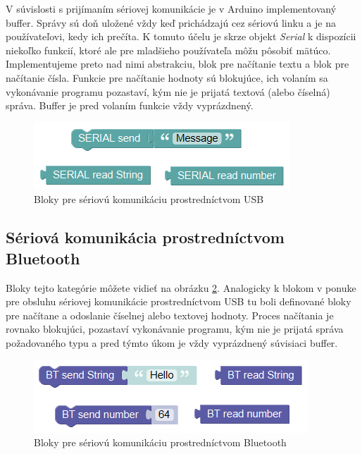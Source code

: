 V súvislosti s prijímaním sériovej komunikácie je v Arduino implementovaný buffer. Správy sú doň uložené vždy keď prichádzajú cez sériovú linku a je na používateľovi, kedy ich prečíta. K tomuto účelu je skrze objekt \textit{Serial} k dispozícii niekoľko funkcií, ktoré ale pre mladšieho používateľa môžu pôsobiť mätúco. Implementujeme preto nad nimi abstrakciu, blok pre načítanie textu a blok pre načítanie čísla. Funkcie pre načítanie hodnoty sú blokujúce, ich volaním sa vykonávanie programu pozastaví, kým nie je prijatá textová (alebo číselná) správa. Buffer je pred volaním funkcie vždy vyprázdnený.

\begin{figure}[h!]
\centerline{\includegraphics[]{images/serial-blocks}}
\caption[Bloky pre sériovú komunikáciu prostredníctvom USB]{Bloky pre sériovú komunikáciu prostredníctvom USB}
\label{obr:serial-blocks}
\end{figure}


\subsection{Sériová komunikácia prostredníctvom Bluetooth}
Bloky tejto kategórie môžete vidieť na obrázku \ref{obr:bluetooth-blocks}. Analogicky k blokom v ponuke pre obsluhu sériovej komunikácie prostredníctvom USB tu boli definované bloky pre načítane a odoslanie číselnej alebo textovej hodnoty. Proces načítania je rovnako blokujúci, pozastaví vykonávanie programu, kým nie je prijatá správa požadovaného typu a pred týmto úkom je vždy vyprázdnený súvisiaci buffer.

\begin{figure}[bh!]
\centerline{\includegraphics[]{images/bluetooth-blocks}}
\caption[Bloky pre sériovú komunikáciu prostredníctvom Bluetooth]{Bloky pre sériovú komunikáciu prostredníctvom Bluetooth}
\label{obr:bluetooth-blocks}
\end{figure}


